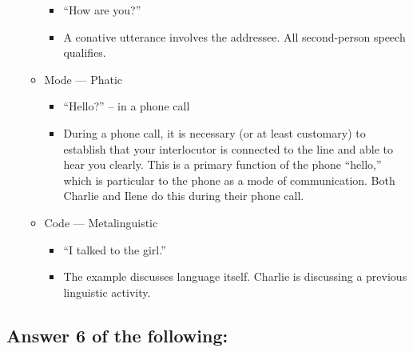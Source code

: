 \documentclass[doc,12pt]{apa6}
\providecommand{\tightlist}{%
  \setlength{\itemsep}{0pt}\setlength{\parskip}{0pt}}
\begin{document}
\begin{enumerate}
\begin{itemize}
    \begin{itemize}
    \tightlist
    \item
      ``How are you?''
    \item
      A conative utterance involves the addressee. All second-person
      speech qualifies.
    \end{itemize}
  \item
    Mode --- Phatic

    \begin{itemize}
    \tightlist
    \item
      ``Hello?'' -- in a phone call
    \item
      During a phone call, it is necessary (or at least customary) to
      establish that your interlocutor is connected to the line and able
      to hear you clearly. This is a primary function of the phone
      ``hello,'' which is particular to the phone as a mode of
      communication. Both Charlie and Ilene do this during their phone
      call.
    \end{itemize}
  \item
    Code --- Metalinguistic

    \begin{itemize}
    \tightlist
    \item
      ``I talked to the girl.''
    \item
      The example discusses language itself. Charlie is discussing a
      previous linguistic activity.
    \end{itemize}
  \end{itemize}
\end{enumerate}

\subsection{Answer 6 of the following:}\label{answer-6-of-the-following}
\end{document}
